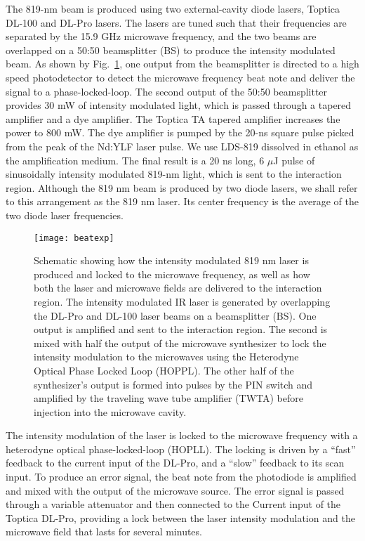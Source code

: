 \documentclass[aps,pra,reprint,groupedaddress]{revtex4-1}
\begin{document}
The 819-nm beam is produced using two external-cavity diode lasers, Toptica DL-100 and DL-Pro lasers. The lasers are tuned such that their frequencies are separated by the 15.9 GHz microwave frequency, and the two beams are overlapped on a 50:50 beamsplitter (BS) to produce the intensity modulated beam. As shown by Fig.~\ref{fig:pll}, one output from the beamsplitter is directed to a high speed photodetector to detect the microwave frequency beat note and deliver the signal to a phase-locked-loop. The second output of the 50:50 beamsplitter provides 30 mW of intensity modulated light, which is passed through a tapered amplifier and a dye amplifier. The Toptica TA tapered amplifier increases the power to 800 mW. The dye amplifier is pumped by the 20-ns square pulse picked from the peak of the Nd:YLF laser pulse. We use LDS-819 dissolved in ethanol as the amplification medium. The final result is a 20 ns long, 6 $\mu$J pulse of sinusoidally intensity modulated 819-nm light, which is sent to the interaction region. Although the 819 nm beam is produced by two diode lasers, we shall refer to this arrangement as the 819 nm laser. Its center frequency is the average of the two diode laser frequencies.

\begin{figure}
	\texttt{[image: beatexp]}
	\caption{Schematic showing how the intensity modulated 819 nm laser is produced and locked to the microwave frequency, as well as how both the laser and microwave fields are delivered to the interaction region. The intensity modulated IR laser is generated by overlapping the DL-Pro and DL-100 laser beams on a beamsplitter (BS). One output is amplified and sent to the interaction region. The second is mixed with half the output of the microwave synthesizer to lock the intensity modulation to the microwaves using the Heterodyne Optical Phase Locked Loop (HOPPL). The other half of the synthesizer's output is formed into pulses by the PIN switch and amplified by the traveling wave tube amplifier (TWTA) before injection into the microwave cavity. }
	\label{fig:pll}
\end{figure}

The intensity modulation of the laser is locked to the microwave frequency with a heterodyne optical phase-locked-loop (HOPLL). The locking is driven by a ``fast'' feedback to the current input of the DL-Pro, and a ``slow'' feedback to its scan input. To produce an error signal, the beat note from the photodiode is amplified and mixed with the output of the microwave source. The error signal is passed through a variable attenuator and then connected to the Current input of the Toptica DL-Pro, providing a lock between the laser intensity modulation and the microwave field that lasts for several minutes.
\end{document}

